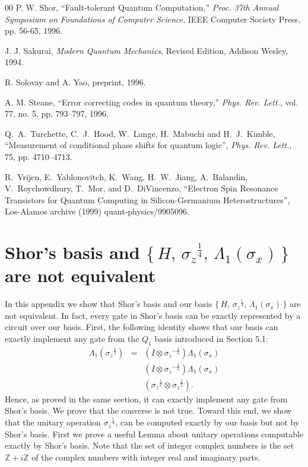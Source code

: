 \documentclass[twocolumn,11pt]{article}
\begin{document}
\begin{thebibliography}{00}
 P. W. Shor, ``Fault-tolerant Quantum Computation,''
{\em Proc. 37th Annual Symposium on Foundations of Computer Science},
IEEE Computer Society Press, pp. 56-65, 1996.

 J. J. Sakurai, {\em Modern Quantum Mechanics}, Revised Edition,
Addison Wesley, 1994.

 R. Solovay and A. Yao, preprint, 1996.

A.  M.  Steane, ``Error correcting codes in quantum theory,''
{\em Phys.  Rev.  Lett.}, vol.  77, no.  5, pp.  793--797, 1996.

Q.~A.~Turchette, C.~J.~Hood, W.~Lange, H.~Mabuchi and H.~J.~Kimble,
``Measurement of conditional phase shifts for quantum logic'',
{\em Phys. Rev. Lett.}, 75, pp. 4710--4713.

R.~Vrijen, E.~Yablonovitch, K.~Wang, H.~W.~Jiang,
A.~Balandin, V.~Roychowdhury, T.~Mor, and D.~DiVincenzo,
``Electron Spin Resonance Transistors for Quantum Computing in
Silicon-Germanium Heterostructures'',
Los-Alamos archive (1999) quant-physics/9905096.



\end{thebibliography}

\appendix

\newtheorem{lemma}{Lemma}[section]

\section{Shor's basis and 
   $\{\, H,\, {\sigma_z}^{\frac{1}{4}},\, \Lambda_1(\sigma_x)\,\}$
   are not equivalent}\label{equiappendix}

In this appendix we show that Shor's basis and our basis
$\{\, H,\, {\sigma_z}^{\frac{1}{4}},\, \Lambda_1(\sigma_x)\,\}$ 
are not equivalent. In fact, every gate in Shor's 
basis can be exactly represented by a circuit over our basis.
First, the following identity shows that our basis can exactly implement 
any gate from the $Q_1$ basis introduced in Section 5.1:
\begin{eqnarray*}
 \Lambda_1({\sigma_z}^{\frac{1}{2}}) 
     & = & \left ( I\otimes{\sigma_z}^{-\frac{1}{4}}\right )\Lambda_1(\sigma_x) \\
     & & \left ( I\otimes{\sigma_z}^{-\frac{1}{4}}\right )\Lambda_1(\sigma_x) \\
     & & \left ( {\sigma_z}^{\frac{1}{4}}\otimes{\sigma_z}^{\frac{1}{2}}\right ).
\end{eqnarray*}
Hence, as proved in the same section, it can exactly implement any gate from
Shor's basis. We prove that the converse is not true. Toward this end, we show that 
the unitary operation ${\sigma_z}^{\frac{1}{4}}$, 
can be computed exactly by our basis but not by
Shor's basis. First we prove a useful Lemma about unitary operations 
computable exactly by Shor's basis. Note that the set of integer complex 
numbers is the set ${\mathbb Z}+i{\mathbb Z}$ of the complex numbers with
integer real and imaginary parts.
\end{document}
